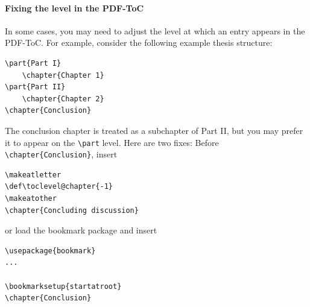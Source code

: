 \paragraph{Fixing the level in the PDF-ToC}
In some cases, you may need to adjust the level at which an entry appears in the PDF-ToC. For example, consider the following example thesis structure:
\begin{lstlisting}
\part{Part I}
	\chapter{Chapter 1}
\part{Part II}
	\chapter{Chapter 2}
\chapter{Conclusion}
\end{lstlisting}
The conclusion chapter is treated as a subchapter of Part II, but you may prefer it to appear on the \verb|\part| level. Here are two fixes:
Before \verb|\chapter{Conclusion}|, insert
\begin{lstlisting}
\makeatletter
\def\toclevel@chapter{-1}
\makeatother
\chapter{Concluding discussion}
\end{lstlisting}
or load the bookmark package and insert
\begin{lstlisting}
\usepackage{bookmark}
...

\bookmarksetup{startatroot}
\chapter{Conclusion}
\end{lstlisting}


